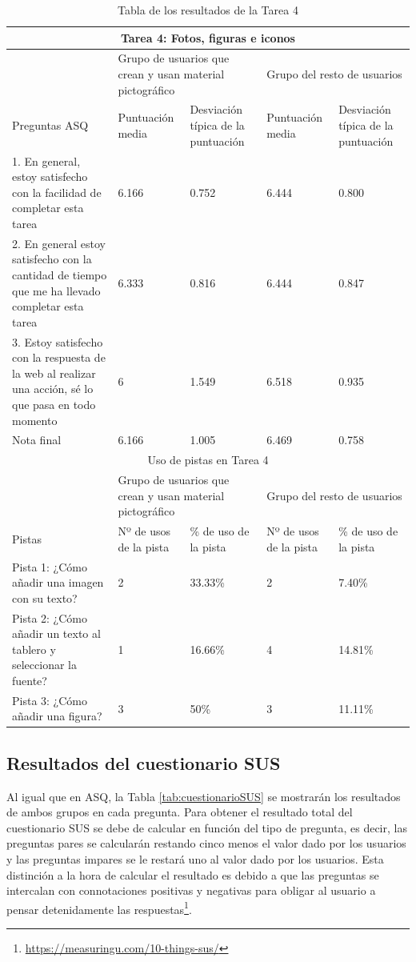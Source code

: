 \begin{table}

\begin{tabular}{ |p{4cm}|p{2cm}|p{2cm}|p{2cm}|p{2cm}|  }
	\hline
	\multicolumn{5}{|c|}{Tarea 4: Fotos, figuras e iconos} \\
	\hline
	& \multicolumn{2}{p{4cm}|}{Grupo de usuarios que crean y usan material pictográfico} & \multicolumn{2}{p{4cm}|}{Grupo del resto de usuarios }  \\ 
	\hline
	Preguntas ASQ & Puntuación media  &Desviación típica de la puntuación & Puntuación media & Desviación típica de la puntuación\\
	\hline
	1. En general, estoy satisfecho con la facilidad de completar esta tarea &6.166  &0.752 &6.444  &0.800\\
	\hline
	2. En general estoy satisfecho con la cantidad de tiempo que me ha llevado completar esta tarea &6.333  &0.816  &6.444 &0.847\\
	\hline
	3. Estoy satisfecho con la respuesta de la web al realizar una acción, sé lo que pasa en todo momento &6 &1.549 &6.518   &0.935\\
	\hline
	Nota final &6.166 &1.005 &6.469  &0.758\\
	\hline
	\multicolumn{5}{|c|}{Uso de pistas en Tarea 4} \\
	\hline
	& \multicolumn{2}{p{4cm}|}{Grupo de usuarios que crean y usan material pictográfico} & \multicolumn{2}{p{4cm}|}{Grupo del resto de usuarios }  \\ 
	\hline
	Pistas &Nº de usos de la pista &\% de uso de la pista&Nº de usos de la pista&\% de uso de la pista\\
	\hline
	Pista 1: ¿Cómo añadir una imagen con su texto? &2  &33.33\% &2 &7.40\%\\
	\hline
	Pista 2: ¿Cómo añadir un texto al tablero y seleccionar la fuente? &1 &16.66\%  &4 &14.81\%\\
	\hline
	Pista 3: ¿Cómo añadir una figura? &3 &50\% &3   &11.11\% \\
	\hline
\end{tabular}
\caption{\label{tab:area4respuestas}Tabla de los resultados de la Tarea 4}
\end{table}

\subsection{Resultados del cuestionario SUS}
Al igual que en ASQ,  la Tabla \ref{tab:cuestionarioSUS} se mostrarán los resultados de ambos grupos en cada pregunta. Para obtener el resultado total del cuestionario SUS se debe de calcular en función del tipo de pregunta, es decir, las preguntas pares se calcularán restando cinco menos el valor dado por los usuarios y las preguntas impares se le restará uno al valor dado por los usuarios.  Esta distinción a la hora de calcular el resultado es debido a que las preguntas se intercalan con connotaciones positivas y negativas para obligar al usuario a pensar detenidamente las respuestas\footnote{\url{https://measuringu.com/10-things-sus/}}.



